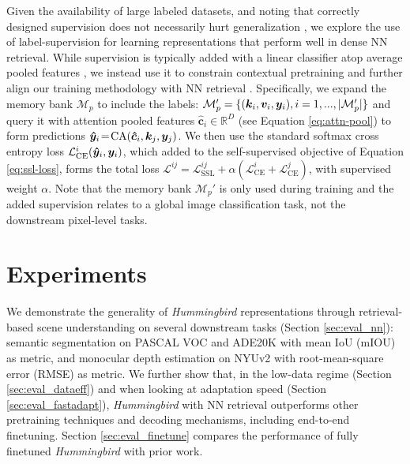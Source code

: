 \documentclass{article}
\newcommand{\ours}{\textit{Hummingbird} }
\begin{document}
Given the availability of large labeled datasets, and noting that correctly designed supervision does not necessarily hurt generalization \cite{sariyildiz2023improving}, we explore the use of label-supervision for learning representations that perform well in dense NN retrieval. While supervision is typically added with a linear classifier atop average pooled features \cite{krizhevsky2012imagenet, simonyan2014very, he2016deep}, we instead use it to constrain contextual pretraining and further align our training methodology with NN retrieval \cite{wu2018improving,touvron2021grafit}. Specifically, we expand the memory bank $\mathcal{M}_p$ to include the labels: $\mathcal{M}_p' = \{ ({\bm{k}}_i, {\bm{v}}_i, {\bm{y}}_i), i=1,...,|\mathcal{M}_p'| \}$ and query it with attention pooled features $\bm{\hat{c}}_i \!\in\! \mathbb{R}^D$ (see Equation \ref{eq:attn-pool}) to form predictions $\bm{\hat{y}}_{i} \!=\! \text{CA}(\bm{\hat{c}}_{i}, {\bm{k}}_j, {\bm{y}}_j)$.
We then use the standard softmax cross entropy loss 
$\mathcal{L}_\textrm{CE}^{i}(\bm{\hat{y}}_{i}, {\bm{y}}_{i})$, which added to the self-supervised objective of Equation \ref{eq:ssl-loss}, forms the total loss $\mathcal{L}^{ij} = \mathcal{L}_\textrm{SSL}^{ij} + \alpha (\mathcal{L}_\textrm{CE}^{i} + \mathcal{L}_\textrm{CE}^{j})$, with supervised weight $\alpha$.
Note that the memory bank $\mathcal{M}_p'$ is only used during training and the added supervision relates to a global image classification task, not the downstream pixel-level tasks.

\vspace{-0.5em}
\section{Experiments}

We demonstrate the generality of \ours representations through retrieval-based scene understanding on several downstream tasks (Section \ref{sec:eval_nn}): semantic segmentation on PASCAL VOC \cite{everingham2015pascal} and ADE20K \cite{zhou2019semantic} with mean IoU (mIOU) as metric, and monocular depth estimation on NYUv2 \cite{silberman2012indoor} with root-mean-square error (RMSE) as metric. We further show that, in the low-data regime (Section \ref{sec:eval_dataeff}) and when looking at adaptation speed (Section \ref{sec:eval_fastadapt}), \ours with NN retrieval outperforms other pretraining techniques and decoding mechanisms, including end-to-end finetuning. Section \ref{sec:eval_finetune} compares the performance of fully finetuned \ours with prior work.
\end{document}
